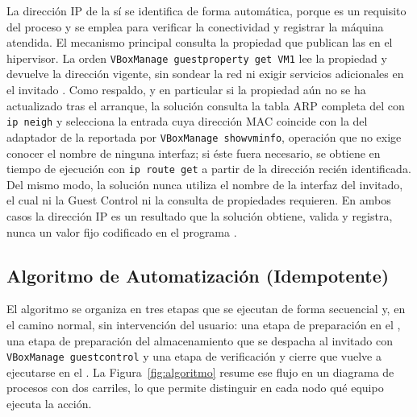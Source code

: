La dirección IP de la \vm{} sí se identifica de forma automática, porque es un requisito del proceso y se emplea para verificar la conectividad y registrar la máquina atendida. El mecanismo principal consulta la propiedad que publican las \guestadditions{} en el hipervisor. La orden \texttt{VBoxManage guestproperty get VM1} lee la propiedad  y devuelve la dirección vigente, sin sondear la red ni exigir servicios adicionales en el invitado \parencite{virtualbox_guestadditions, virtualbox_vboxmanage}. Como respaldo, y en particular si la propiedad aún no se ha actualizado tras el arranque, la solución consulta la tabla ARP completa del \host{} con \texttt{ip neigh} y selecciona la entrada cuya dirección MAC coincide con la del adaptador de la \vm{} reportada por \texttt{VBoxManage showvminfo}, operación que no exige conocer el nombre de ninguna interfaz; si éste fuera necesario, se obtiene en tiempo de ejecución con \texttt{ip route get} a partir de la dirección recién identificada. Del mismo modo, la solución nunca utiliza el nombre de la interfaz del invitado, el cual ni la Guest Control ni la consulta de propiedades requieren. En ambos casos la dirección IP es un resultado que la solución obtiene, valida y registra, nunca un valor fijo codificado en el programa \parencite{virtualbox_networking}.

\subsection{Algoritmo de Automatización (Idempotente)}
\label{sub:algoritmo}

El algoritmo se organiza en tres etapas que se ejecutan de forma secuencial y, en el camino normal, sin intervención del usuario: una etapa de preparación en el \host{}, una etapa de preparación del almacenamiento que se despacha al invitado con \texttt{VBoxManage guestcontrol} y una etapa de verificación y cierre que vuelve a ejecutarse en el \host{}. La Figura~\ref{fig:algoritmo} resume ese flujo en un diagrama de procesos con dos carriles, lo que permite distinguir en cada nodo qué equipo ejecuta la acción.

